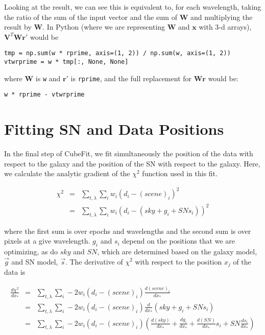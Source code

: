 \documentclass[12pt]{article}
\newcommand{\x}{\mathbf{x}}
\newcommand{\rvect}{\mathbf{r}}
\newcommand{\W}{\mathbf{W}}
\newcommand{\V}{\mathbf{V}}
\begin{document}
\noindent Looking at the result, we can see this is equivalent to, for
each wavelength, taking the ratio of the sum of the input vector and
the sum of $\W$ and multiplying the result by $\W$. In Python (where
we are representing $\W$ and $\x$ with 3-d arrays), $\V^T \W \mathbf{r'}$
would be

\begin{verbatim}
tmp = np.sum(w * rprime, axis=(1, 2)) / np.sum(w, axis=(1, 2))
vtwrprime = w * tmp[:, None, None]
\end{verbatim}

\noindent where $\W$ is \verb|w| and $\mathbf{r'}$ is \verb|rprime|, and the
full replacement for $\W \rvect$ would be:

\begin{verbatim}
w * rprime - vtwrprime
\end{verbatim}

\section{Fitting SN and Data Positions}

In the final step of CubeFit, we fit simultaneously the position of
the data with respect to the galaxy and the position of the SN with
respect to the galaxy. Here, we calculate the analytic gradient of the
$\chi^2$ function used in this fit.

\begin{eqnarray*}
\chi^2 &=& \sum_{t, \lambda} \sum_i w_i (d_i - (scene)_i)^2 \\
       &=& \sum_{t, \lambda} \sum_i w_i (d_i - (sky + g_i + SN s_i))^2
\end{eqnarray*}

\noindent where the first sum is over epochs and wavelengths and the
second sum is over pixels at a give wavelength. $g_i$ and $s_i$ depend
on the positions that we are optimizing, as do $sky$ and $SN$, which
are determined based on the galaxy model, $\vec{g}$ and SN model,
$\vec{s}$.  The derivative of $\chi^2$ with respect to the position
$x_j$ of the data is

\begin{eqnarray*}
\frac{d\chi^2}{dx_\ast} &=& \sum_{t, \lambda} \sum_i -2 w_i (d_i - (scene)_i) \frac{d(scene)_i}{dx_\ast} \\
                     &=& \sum_{t, \lambda} \sum_i -2 w_i (d_i - (scene)_i) \frac{d}{dx_\ast} (sky + g_i + SN s_i) \\
                     &=&  \sum_{t, \lambda} \sum_i -2 w_i (d_i - (scene)_i) \left(\frac{d(sky)}{dx_\ast} + \frac{dg_i}{dx_\ast} + \frac{d(SN)}{dx_\ast} s_i + SN \frac{ds_i}{dx_\ast}\right)
\end{eqnarray*}
\end{document}
